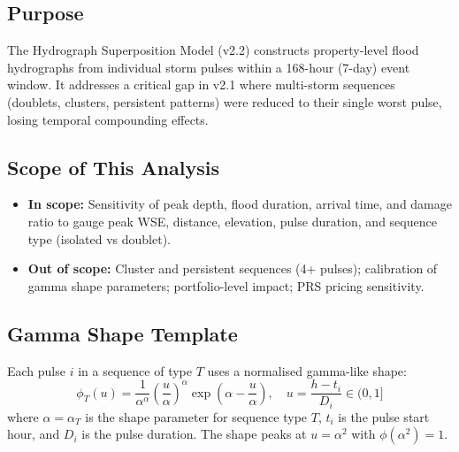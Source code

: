 \documentclass[11pt,a4paper]{article}
\begin{document}
\mkmpurpose

\subsection{Purpose}
The Hydrograph Superposition Model (v2.2) constructs property-level flood
hydrographs from individual storm pulses within a 168-hour (7-day) event window.
It addresses a critical gap in v2.1 where multi-storm sequences (doublets,
clusters, persistent patterns) were reduced to their single worst pulse, losing
temporal compounding effects.

\subsection{Scope of This Analysis}
\begin{itemize}[nosep]
    \item \textbf{In scope:} Sensitivity of peak depth, flood duration, arrival
          time, and damage ratio to gauge peak WSE, distance, elevation, pulse
          duration, and sequence type (isolated vs doublet).
    \item \textbf{Out of scope:} Cluster and persistent sequences (4+ pulses);
          calibration of gamma shape parameters; portfolio-level impact; PRS
          pricing sensitivity.
\end{itemize}

\mkmframework

\subsection{Gamma Shape Template}
Each pulse $i$ in a sequence of type $T$ uses a normalised gamma-like shape:
\begin{equation}
    \phi_T(u) = \frac{1}{\alpha^{\alpha}} \left(\frac{u}{\alpha}\right)^{\alpha}
    \exp\!\left(\alpha - \frac{u}{\alpha}\right), \quad u = \frac{h - t_i}{D_i} \in (0, 1]
    \label{eq:gamma_shape}
\end{equation}
where $\alpha = \alpha_T$ is the shape parameter for sequence type $T$, $t_i$ is
the pulse start hour, and $D_i$ is the pulse duration.  The shape peaks at
$u = \alpha^2$ with $\phi(\alpha^2) = 1$.
\end{document}
